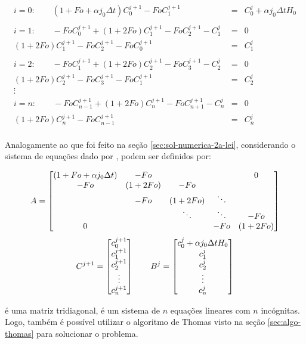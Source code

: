 \begin{equation*}
\label{eq:depoisFo}
\begin{matrix}
i = 0: \qquad (1 + Fo + \alpha j_0 \Delta t)C_0^{j+1} - FoC_{1}^{j+1} & = & C_0^j + \alpha j_0 \Delta t H_0 \\
\\
i = 1: \qquad -FoC_{0}^{j+1} + (1+2Fo)C_1^{j+1} - FoC_{2}^{j+1} - C_1^j & = & 0\\
(1+2Fo)C_1^{j+1} - FoC_{2}^{j+1} - FoC_{0}^{j+1} & = & C_1^j \\ 
\\
i = 2: \qquad -FoC_{1}^{j+1} + (1+2Fo)C_2^{j+1} - FoC_{3}^{j+1} - C_2^j & = & 0\\
(1+2Fo)C_2^{j+1} - FoC_{3}^{j+1} - FoC_{1}^{j+1} & = & C_2^j \\ 
\vdots \\
i = n: \qquad -FoC_{n-1}^{j+1} + (1+2Fo)C_n^{j+1} - FoC_{n+1}^{j+1} - C_n^j & = & 0\\
(1+2Fo)C_n^{j+1} - FoC_{n-1}^{j+1} & = & C_n^j \\
\end{matrix}
\end{equation*}

Analogamente ao que foi feito na seção \ref{sec:sol-numerica-2a-lei}, considerando o sistema de equações dado por ,  podem ser definidos por:

\begin{equation*}
	\cmrtext{A} =
	\begin{bmatrix}
		(1 + Fo + \alpha j_0 \Delta t) & -Fo &         &        & 0\\
		-Fo & (1+2Fo) &  -Fo   &        & \\
		    & -Fo &   (1+2Fo)   & \ddots & \\
		    &     &  \ddots & \ddots & -Fo \\
	     0  &     &         &  -Fo   & (1+2Fo) 
	\end{bmatrix}
\end{equation*}
\begin{equation*}
	\cmrtext{C^{j+1}} =
	\begin{bmatrix}
		c_0^{j+1} \\
		c_1^{j+1} \\
		c_2^{j+1} \\
		\vdots \\
		c_n^{j+1}
	\end{bmatrix}
	\qquad
	\cmrtext{B^j} =	
	\begin{bmatrix}
	c_0^j + \alpha j_0 \Delta t H_0 \\
		c_1^j \\
		c_2^{j} \\
		\vdots \\
		c_n^{j}
	\end{bmatrix}
\end{equation*}

 é uma matriz tridiagonal,  é um sistema de $n$ equações lineares com $n$ incógnitas. Logo, também é possível utilizar o algoritmo de Thomas visto na seção \ref{sec:algo-thomas} para solucionar o problema.

